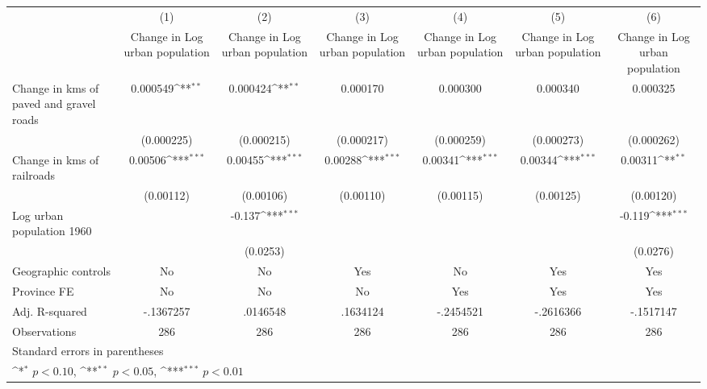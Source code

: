 {
\def\sym#1{\ifmmode^{#1}\else\(^{#1}\)\fi}
\begin{tabular}{l*{6}{c}}
\hline\hline
                    &\multicolumn{1}{c}{(1)}&\multicolumn{1}{c}{(2)}&\multicolumn{1}{c}{(3)}&\multicolumn{1}{c}{(4)}&\multicolumn{1}{c}{(5)}&\multicolumn{1}{c}{(6)}\\
                    &\multicolumn{1}{c}{Change in Log urban population}&\multicolumn{1}{c}{Change in Log urban population}&\multicolumn{1}{c}{Change in Log urban population}&\multicolumn{1}{c}{Change in Log urban population}&\multicolumn{1}{c}{Change in Log urban population}&\multicolumn{1}{c}{Change in Log urban population}\\
\hline
Change in kms of paved and gravel roads&    0.000549\sym{**} &    0.000424\sym{**} &    0.000170         &    0.000300         &    0.000340         &    0.000325         \\
                    &  (0.000225)         &  (0.000215)         &  (0.000217)         &  (0.000259)         &  (0.000273)         &  (0.000262)         \\
[1em]
Change in kms of railroads&     0.00506\sym{***}&     0.00455\sym{***}&     0.00288\sym{***}&     0.00341\sym{***}&     0.00344\sym{***}&     0.00311\sym{**} \\
                    &   (0.00112)         &   (0.00106)         &   (0.00110)         &   (0.00115)         &   (0.00125)         &   (0.00120)         \\
[1em]
Log urban population 1960&                     &      -0.137\sym{***}&                     &                     &                     &      -0.119\sym{***}\\
                    &                     &    (0.0253)         &                     &                     &                     &    (0.0276)         \\
\hline
Geographic controls &          No         &          No         &         Yes         &          No         &         Yes         &         Yes         \\
Province FE         &          No         &          No         &          No         &         Yes         &         Yes         &         Yes         \\
Adj. R-squared      &   -.1367257         &    .0146548         &    .1634124         &   -.2454521         &   -.2616366         &   -.1517147         \\
Observations        &         286         &         286         &         286         &         286         &         286         &         286         \\
\hline\hline
\multicolumn{7}{l}{\footnotesize Standard errors in parentheses}\\
\multicolumn{7}{l}{\footnotesize \sym{*} \(p<0.10\), \sym{**} \(p<0.05\), \sym{***} \(p<0.01\)}\\
\end{tabular}
}
